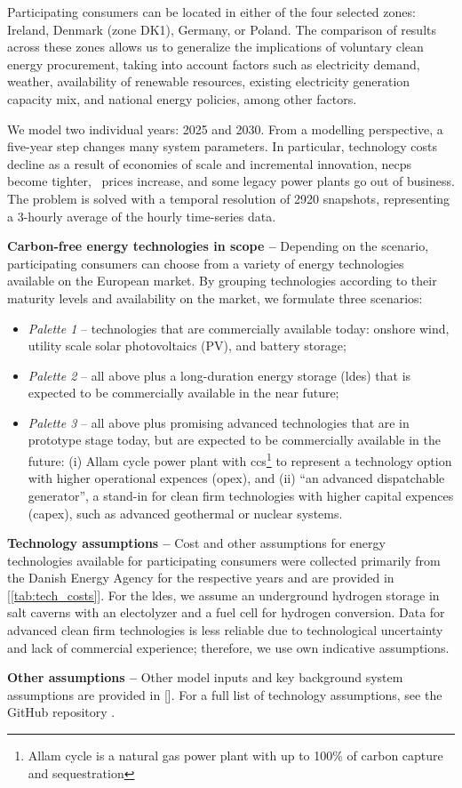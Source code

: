 Participating consumers can be located in either of the four selected zones: Ireland, Denmark (zone DK1), Germany, or Poland.
The comparison of results across these zones allows us to generalize the implications of voluntary clean energy procurement, taking into account factors such as electricity demand, weather, availability of renewable resources, existing electricity generation capacity mix, and national energy policies, among other factors.

We model two individual years: 2025 and 2030.
From a modelling perspective, a five-year step changes many system parameters.
In particular, technology costs decline as a result of economies of scale and incremental innovation, \gls{necp}s become tighter, \co~prices increase, and some legacy power plants go out of business.
The problem is solved with a temporal resolution of 2920 snapshots, representing a 3-hourly average of the hourly time-series data.

\textbf{Carbon-free energy technologies in scope --} Depending on the scenario, participating consumers can choose from a variety of energy technologies available on the European market. By grouping technologies according to their maturity levels and availability on the market, we formulate three scenarios:

\begin{itemize}[-]
    \item \textit{Palette 1} -- technologies that are commercially available today: onshore wind, utility scale solar photovoltaics (\gls{PV}), and battery storage;
    \item \textit{Palette 2} -- all above plus a long-duration energy storage (\gls{ldes}) that is expected to be commercially available in the near future;
    \item \textit{Palette 3} -- all above plus promising advanced technologies that are in prototype stage today, but are expected to be commercially available in the future: (i) Allam cycle power plant with \gls{ccs}\footnote{Allam cycle is a natural gas power plant with up to 100\% of carbon capture and sequestration} to represent a technology option with higher operational expences (\gls{opex}), and (ii) \enquote{an advanced dispatchable generator}, a stand-in for clean firm technologies with higher capital expences (\gls{capex}), such as advanced geothermal or nuclear systems.
\end{itemize}

\textbf{Technology assumptions --} Cost and other assumptions for energy technologies available for participating consumers were collected primarily from the Danish Energy Agency \cite{DEA-technologydata} for the respective years and are provided in [\cref{tab:tech_costs}].
For the \gls{ldes}, we assume an underground hydrogen storage in salt caverns with an electolyzer and a fuel cell for hydrogen conversion.
Data for advanced clean firm technologies is less reliable due to technological uncertainty and lack of commercial experience; therefore, we use own indicative assumptions.

\textbf{Other assumptions --} Other model inputs and key background system assumptions are provided in []. For a full list of technology assumptions, see the GitHub repository \cite{github-247CFEpaper}.